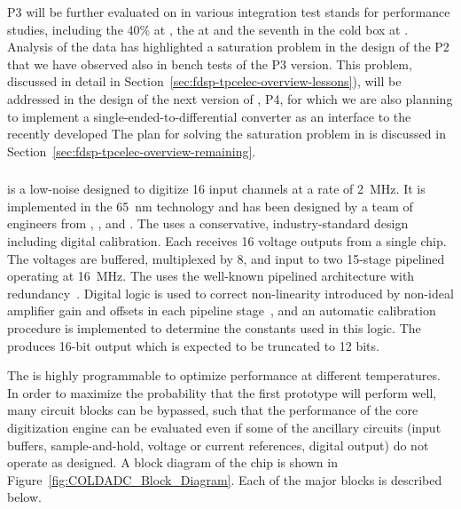P3   will be further evaluated on  
in various integration test stands for performance studies, including 
the \num{40}\%  at , the   
at  and the seventh   
in the cold box at . Analysis of the  data
has highlighted a saturation problem in the design of the P2  
that we have observed also in bench tests of the P3 version. This problem,
discussed in detail in Section~\ref{sec:fdsp-tpcelec-overview-lessons}),
will be addressed in the design of the next version of , P4,
for which we are also planning to implement a single-ended-to-differential
converter as an interface to the recently developed 
The plan for solving the saturation problem in  is discussed 
in Section~\ref{sec:fdsp-tpcelec-overview-remaining}.

\subsubsection{ }
\label{sec:fdsp-tpcelec-design-femb-adc}

 is a low-noise   designed to digitize
\num{16} input channels at a rate of \SI{2}{MHz}. It is implemented in the 
\SI{65}{nm}  technology and has been designed by a team of engineers
from , , and .  The  uses a conservative,
industry-standard design including digital calibration.  Each 
receives \num{16} voltage outputs from a single  chip.  The voltages
are buffered, multiplexed by \num{8}, and input to two \num{15}-stage pipelined 
operating at \SI{16}{MHz}.  The  uses the well-known pipelined architecture
with redundancy~\cite{PipelinedADC}.  Digital logic is used to correct non-linearity
introduced by non-ideal amplifier gain and offsets in each pipeline
stage~\cite{CalibrationCorrection}, and an automatic calibration procedure is
implemented to determine the constants used in this logic.  The  produces
\num{16}-bit output which is expected to be truncated to \num{12} bits.

The  is highly programmable to optimize performance at different
temperatures.  In order to maximize the probability that the first prototype
 will perform well, many circuit blocks can be bypassed, such
that the performance of the core digitization engine can be evaluated even
if some of the ancillary circuits (input buffers, sample-and-hold, voltage or current 
references, digital output) do not operate as designed. A block
diagram of the chip is shown in Figure~\ref{fig:COLDADC_Block_Diagram}. Each of
the major blocks is described below.

